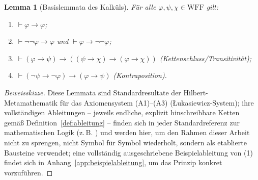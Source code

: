 \documentclass[12pt, a4paper]{article}
\newtheorem{lemma}[theorem]{Lemma}
\theoremstyle{definition}
\theoremstyle{remark}
\newcommand{\WFF}{\mathrm{WFF}}
\begin{document}
\begin{lemma}[Basislemmata des Kalküls]
\label{lem:basislemmata}
Für alle $\varphi,\psi,\chi\in\WFF$ gilt:
\begin{enumerate}[label=(\arabic*)]
  \item $\vdash \varphi \to \varphi$;
  \item $\vdash \neg\neg\varphi \to \varphi$ und $\vdash \varphi \to \neg\neg\varphi$;
  \item $\vdash (\varphi\to\psi) \to ((\psi\to\chi)\to(\varphi\to\chi))$ (Kettenschluss/Transitivität);
  \item $\vdash (\neg\psi\to\neg\varphi) \to (\varphi\to\psi)$ (Kontraposition).
\end{enumerate}
\end{lemma}
\begin{proof}[Beweisskizze]
Diese Lemmata sind Standardresultate der Hilbert-Metamathematik für das Axiomensystem (A1)--(A3) (Łukasiewicz-System); ihre vollständigen Ableitungen -- jeweils endliche, explizit hinschreibbare Ketten gemäß Definition~\ref{def:ableitung} -- finden sich in jeder Standardreferenz zur mathematischen Logik (z.\,B. \citealp{rautenberg2008,ebbinghaus2007}) und werden hier, um den Rahmen dieser Arbeit nicht zu sprengen, nicht Symbol für Symbol wiederholt, sondern als etablierte Bausteine verwendet; eine vollständig ausgeschriebene Beispielableitung von (1) findet sich in Anhang~\ref{app:beispielableitung}, um das Prinzip konkret vorzuführen.
\end{proof}
\end{document}
